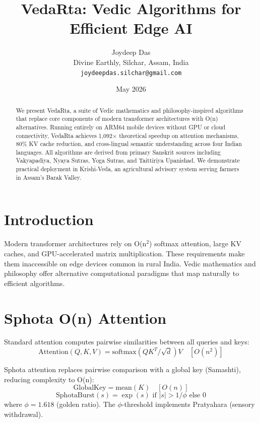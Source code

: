 \documentclass[12pt,a4paper]{article}
\title{VedaRta: Vedic Algorithms for Efficient Edge AI}
\author{Joydeep Das\\
Divine Earthly, Silchar, Assam, India\\
\texttt{joydeepdas.silchar@gmail.com}}
\date{May 2026}
\begin{document}
\maketitle

\begin{abstract}
We present VedaRta, a suite of Vedic mathematics and philosophy-inspired algorithms that replace core components of modern transformer architectures with O(n) alternatives. Running entirely on ARM64 mobile devices without GPU or cloud connectivity, VedaRta achieves 1,092$\times$ theoretical speedup on attention mechanisms, 80\% KV cache reduction, and cross-lingual semantic understanding across four Indian languages. All algorithms are derived from primary Sanskrit sources including Vakyapadiya, Nyaya Sutras, Yoga Sutras, and Taittiriya Upanishad. We demonstrate practical deployment in Krishi-Veda, an agricultural advisory system serving farmers in Assam's Barak Valley.
\end{abstract}

\section{Introduction}
Modern transformer architectures rely on O(n$^2$) softmax attention, large KV caches, and GPU-accelerated matrix multiplication. These requirements make them inaccessible on edge devices common in rural India. Vedic mathematics and philosophy offer alternative computational paradigms that map naturally to efficient algorithms.

\section{Sphota O(n) Attention}
Standard attention computes pairwise similarities between all queries and keys:
\begin{equation}
\text{Attention}(Q,K,V) = \text{softmax}(QK^T/\sqrt{d})V \quad [O(n^2)]
\end{equation}

Sphota attention replaces pairwise comparison with a global key (Samashti), reducing complexity to O(n):
\begin{equation}
\text{GlobalKey} = \text{mean}(K) \quad [O(n)]
\end{equation}
\begin{equation}
\text{SphotaBurst}(s) = \exp(s) \text{ if } |s| > 1/\phi \text{ else } 0
\end{equation}
where $\phi = 1.618$ (golden ratio). The $\phi$-threshold implements Pratyahara (sensory withdrawal).
\end{document}
